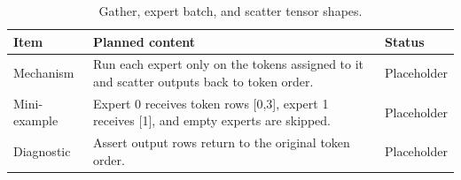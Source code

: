 \begin{table}[H]
\centering
\caption{Gather, expert batch, and scatter tensor shapes.}
\label{tab:ch04-dispatching-tokens-to-selected-experts}
\begin{tabularx}{\textwidth}{p{}X p{}}
\toprule
Item & Planned content & Status \\
\midrule
Mechanism & Run each expert only on the tokens assigned to it and scatter outputs back to token order. & Placeholder \\
Mini-example & Expert 0 receives token rows [0,3], expert 1 receives [1], and empty experts are skipped. & Placeholder \\
Diagnostic & Assert output rows return to the original token order. & Placeholder \\
\bottomrule
\end{tabularx}
\end{table}
